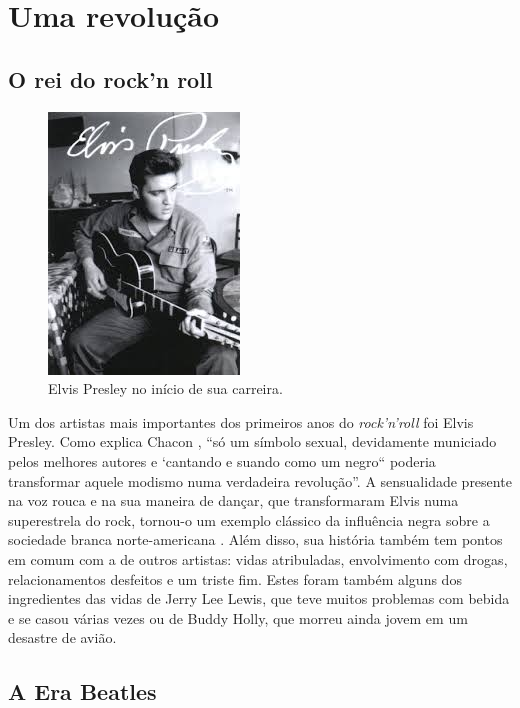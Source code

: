
\chapter{Uma revolução}

\section{O rei do rock'n roll}

\begin{figure}[!htb]
  \centering
  \includegraphics[scale=0.45]{imagens/elvis}
  \caption{Elvis Presley no início de sua carreira.}
  \label{fig:elvis}
\end{figure}

Um dos artistas mais importantes dos primeiros anos do {\it rock’n’roll} foi Elvis Presley. Como explica 
Chacon \cite{CHA1985}, ``só um símbolo sexual, devidamente municiado pelos melhores autores e ‘cantando e 
suando 
como um 
negro`` poderia transformar aquele modismo numa verdadeira revolução”. A sensualidade presente na voz rouca 
e 
na sua maneira de dançar, que transformaram Elvis numa superestrela do rock, tornou-o um exemplo clássico da 
influência negra sobre a sociedade branca norte-americana \cite{CHA1985}. Além disso, sua história também 
tem pontos em comum com a de outros artistas: vidas atribuladas, 
envolvimento com drogas, relacionamentos desfeitos e um triste fim. Estes foram também alguns dos 
ingredientes das vidas de Jerry Lee Lewis, que teve muitos problemas com bebida e se casou várias vezes ou 
de Buddy Holly, que morreu ainda jovem em um desastre de avião.
  
\section{A Era Beatles}

